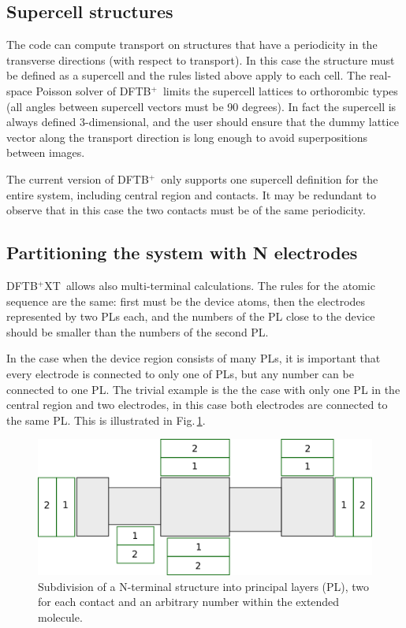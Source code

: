 \documentclass[a4paper,11pt,english]{sphinxmanual}
\newcommand{\dftbp}{\textsf{DFTB$^{\text{+}}$\ }} %
\newcommand{\dftbpxt}{\textsf{DFTB$^{\text{+}}$XT\ }} %
\begin{document}
{\subsection{Supercell structures}

The code can compute transport on structures that have a periodicity in the transverse directions (with respect to transport). In this case the structure must be defined as a supercell and the rules listed above apply to each cell. The real-space Poisson solver of \dftbp limits the supercell lattices to orthorombic types (all angles between supercell vectors must be 90 degrees). In fact the supercell is always defined 3-dimensional, and the user should ensure that the dummy lattice vector along the transport direction is long enough to avoid superpositions between images.

The current version of \dftbp only supports one supercell definition for the entire system, including central region and contacts. It may be redundant to observe that in this case the two contacts must be of the same periodicity.

\subsection{Partitioning the system with N electrodes}

\dftbpxt allows also multi-terminal calculations. The rules for the atomic sequence are the same: first must be the device atoms, then the electrodes represented by two PLs each, and the numbers of the PL close to the device should be smaller than the numbers of the second PL.

In the case when the device region consists of many PLs, it is important that every electrode is connected to only one of PLs, but any number can be connected to one PL. The trivial example is the the case with only one PL in the central region and two electrodes, in this case both electrodes are connected to the same PL. This is illustrated in Fig.\,\ref{Nterminal}.

\begin{figure}[htbp]
\centering
\capstart
\includegraphics[width=0.8\linewidth]{Nterminal.png}
\caption{Subdivision of a N-terminal structure into principal layers (PL), two for each contact and an arbitrary number within the extended molecule.}
\label{Nterminal}
\end{figure}

}
\end{document}
